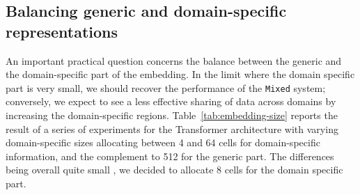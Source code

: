 \documentclass[11pt,a4paper]{article}
\newcommand{\fyTodo}[1]{\Todo[FY:]{\textcolor{orange}{#1}}}
\begin{document}
\subsection{Balancing generic and domain-specific representations\label{secc:region_size}}

An important practical question concerns the balance between the generic and the domain-specific part of the embedding. In the limit where the domain specific part is very small, we should recover the performance of the \texttt{Mixed} system; conversely, we expect to see a less effective sharing of data across domains by increasing the domain-specific regions. Table~\ref{tab:embedding-size} reports the result of  a series of experiments for the Transformer\fyTodo{Check This} architecture with varying domain-specific sizes allocating between 4 and 64 cells for domain-specific information, and the complement to 512 for the generic part. The differences being overall quite small \fyTodo{Comments - is this due to prior ?}, we decided to allocate $8$ cells for the domain specific part. \fyTodo{Easily accomodate more domains}
\fyTodo{Given the ways embeddings are computed, why not add more domains, and test robustness agains data presentation order ?}
\begin{table}[!h]
\begin{center}
\end{center}
\caption{BPE-detokenized BLEU scores for the Transformer architecture for varying domain-specific embedding sizes}
\end{table}
\end{document}
